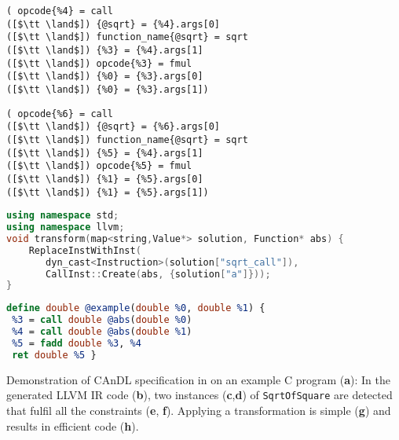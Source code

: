 \begin{minipage}[t]{\textwidth}
\begin{minipage}[t]{0.493\textwidth}
\centering
\vspace{-0.19cm}
\begin{lstlisting}[language=CAnDL,
                   numbers=none,framexleftmargin=0pt,xleftmargin=0pt,
                   captionpos=t,title={{\bf(e)} Verification of first solution:}]
( opcode{%4} = call
([$\tt \land$]) {@sqrt} = {%4}.args[0]
([$\tt \land$]) function_name{@sqrt} = sqrt
([$\tt \land$]) {%3} = {%4}.args[1]
([$\tt \land$]) opcode{%3} = fmul
([$\tt \land$]) {%0} = {%3}.args[0]
([$\tt \land$]) {%0} = {%3}.args[1])
\end{lstlisting}
\end{minipage}
\hfill
\begin{minipage}[t]{0.493\textwidth}
\centering
\vspace{-0.19cm}
\begin{lstlisting}[language=CAnDL,
                   numbers=none,framexleftmargin=0pt,xleftmargin=0pt,
                   captionpos=t,title=
   {{\bf(f)} Verification of second solution:}]
( opcode{%6} = call
([$\tt \land$]) {@sqrt} = {%6}.args[0]
([$\tt \land$]) function_name{@sqrt} = sqrt
([$\tt \land$]) {%5} = {%4}.args[1]
([$\tt \land$]) opcode{%5} = fmul
([$\tt \land$]) {%1} = {%5}.args[0]
([$\tt \land$]) {%1} = {%5}.args[1])
\end{lstlisting}
\end{minipage}
\end{minipage}

\begin{minipage}[t]{\textwidth}
\centering
\vspace{-0.19cm}
\begin{lstlisting}[language=C++,captionpos=t,title=
   {{\bf(g)} C++ transformation code:}]
using namespace std;
using namespace llvm;
void transform(map<string,Value*> solution, Function* abs) {
    ReplaceInstWithInst(
       dyn_cast<Instruction>(solution["sqrt_call"]),
       CallInst::Create(abs, {solution["a"]}));
}
\end{lstlisting}
\end{minipage}

\begin{minipage}[t]{\textwidth}
\centering
\vspace{-0.19cm}
\begin{lstlisting}[language=LLVM,captionpos=t,title=
   {{\bf(h)} Transformed LLVM IR after dead code elimination:}]
define double @example(double %0, double %1) {              
 %3 = call double @abs(double %0) 
 %4 = call double @abs(double %1)
 %5 = fadd double %3, %4   
 ret double %5 }
\end{lstlisting}
\end{minipage}

\caption{Demonstration of CAnDL specification in 
         on an example C program ({\bf a}):
         In the generated LLVM IR code ({\bf b}), two instances
         ({\bf c},{\bf d}) of {\tt SqrtOfSquare} are detected that fulfil all
         the constraints ({\bf e}, {\bf f}).
         Applying a transformation is simple ({\bf g}) and results in efficient
         code ({\bf h}).\parfillskip=0pt}